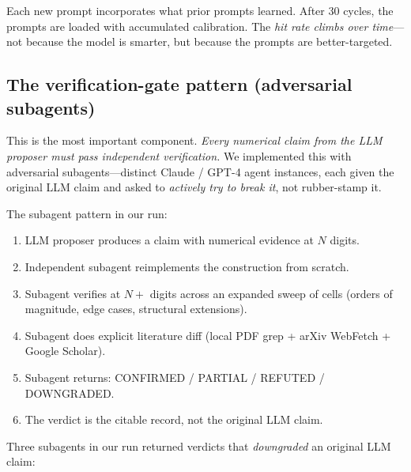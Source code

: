 \documentclass[11pt,reqno]{amsart}
\theoremstyle{definition}
\begin{document}
Each new prompt incorporates what prior prompts learned. After $30$
cycles, the prompts are loaded with accumulated calibration. The
\emph{hit rate climbs over time}---not because the model is smarter,
but because the prompts are better-targeted.

\subsection{The verification-gate pattern (adversarial subagents)}\label{sec:verification-gate}

This is the most important component. \emph{Every numerical claim
from the LLM proposer must pass independent verification.} We
implemented this with adversarial subagents---distinct Claude /
GPT-4 agent instances, each given the original LLM claim and asked
to \emph{actively try to break it}, not rubber-stamp it.

The subagent pattern in our run:

\begin{enumerate}[leftmargin=2em]
\item LLM proposer produces a claim with numerical evidence at $N$
digits.
\item Independent subagent reimplements the construction from
scratch.
\item Subagent verifies at $N+$ digits across an expanded sweep of
cells (orders of magnitude, edge cases, structural extensions).
\item Subagent does explicit literature diff (local PDF grep + arXiv
WebFetch + Google Scholar).
\item Subagent returns: CONFIRMED / PARTIAL / REFUTED / DOWNGRADED.
\item The verdict is the citable record, not the original LLM claim.
\end{enumerate}

Three subagents in our run returned verdicts that \emph{downgraded}
an original LLM claim:
\end{document}
